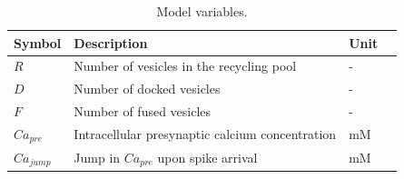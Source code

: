 \documentclass[fleqn,10pt]{wlscirep}
\begin{document}
\begin{table}[!ht]
	\centering
	\caption{Model variables.}
	\label{tab:model_vars}
	\begin{tabular}{@{}llll@{}}
		\toprule
		{\bf Symbol} & {\bf Description}                     & {\bf Unit}         \\
		\midrule
		$R$          & Number of vesicles in the recycling pool                                  & - 	\\
		$D$          & Number of docked vesicles                                & - 	\\
		$F$          & Number of fused vesicles                  & - 	\\
		$Ca_{pre}$          & Intracellular presynaptic calcium concentration                & mM 	\\
		$Ca_{jump}$          & Jump in   $Ca_{pre}$ upon spike arrival             & mM 	\\
		\bottomrule
	\end{tabular}
\end{table}
\end{document}
